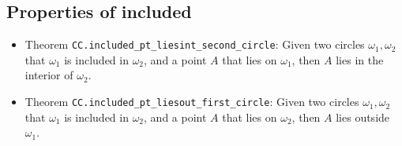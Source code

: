 \documentclass[12pt]{amsart}
\begin{document}
\subsection{Properties of included}
\begin{itemize}
    \item Theorem \verb|CC.included_pt_liesint_second_circle|: Given two circles $\omega_1,\omega_2$ that $\omega_1$ is included in $\omega_2$, and a point $A$ that lies on $\omega_1$, then $A$ lies in the interior of $\omega_2$.
    \item Theorem \verb|CC.included_pt_liesout_first_circle|: Given two circles $\omega_1,\omega_2$ that $\omega_1$ is included in $\omega_2$, and a point $A$ that lies on $\omega_2$, then $A$ lies outside $\omega_1$.
\end{itemize}
\end{document}
